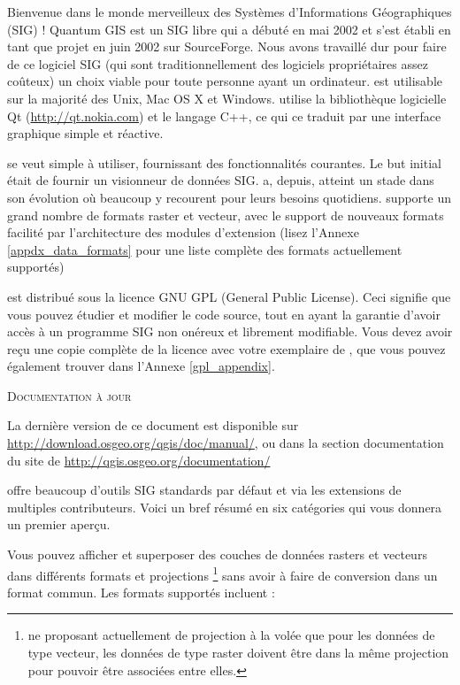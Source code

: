 \mainmatter
\pagestyle{scrheadings}
\label{label_forward}

Bienvenue dans le monde merveilleux des Systèmes d'Informations Géographiques (SIG) ! Quantum GIS est un SIG libre qui a débuté en mai 2002 et s'est établi en tant que projet en juin 2002 sur SourceForge. Nous avons travaillé dur pour faire de ce logiciel SIG (qui sont traditionnellement des logiciels propriétaires assez coûteux) un choix viable pour toute personne ayant un ordinateur. \qg est utilisable sur la majorité des Unix, Mac OS X et Windows. \qg utilise la bibliothèque logicielle Qt (\url{http://qt.nokia.com}) et le langage C++, ce qui ce traduit par une interface graphique simple et réactive.

\qg se veut simple à utiliser, fournissant des fonctionnalités courantes. Le but initial était de fournir un visionneur de données SIG. \qg a, depuis, atteint un stade dans son évolution où beaucoup y recourent pour leurs besoins quotidiens. \qg supporte un grand nombre de formats raster et vecteur, avec le support de nouveaux formats facilité par l'architecture des modules d'extension (lisez l'Annexe \ref{appdx_data_formats} pour une liste complète des formats actuellement supportés)

\qg est distribué sous la licence GNU GPL (General Public License). Ceci signifie que vous pouvez étudier et modifier le code source, tout en ayant la garantie d'avoir accès à un programme SIG non onéreux et librement modifiable. Vous devez avoir reçu une copie complète de la licence avec votre exemplaire de \qg, que vous pouvez également trouver dans l'Annexe \ref{gpl_appendix}.

\begin{Tip}\caption{\textsc{Documentation à jour}}
La dernière version de ce document est disponible sur \url{http://download.osgeo.org/qgis/doc/manual/}, ou dans la section documentation du site de \qg \url{http://qgis.osgeo.org/documentation/}
\end{Tip}

\label{label_majfeat}

\qg offre beaucoup d'outils SIG standards par défaut et via les extensions de multiples contributeurs. Voici un bref résumé en six catégories qui vous donnera un premier aperçu.


Vous pouvez afficher et superposer des couches de données rasters et vecteurs dans différents formats et projections \footnote{\qg ne proposant actuellement de projection à la volée que pour les données de type vecteur, les données de type raster doivent être dans la même projection pour pouvoir être associées entre elles.} sans avoir à faire de conversion dans un format commun. Les formats supportés incluent :

